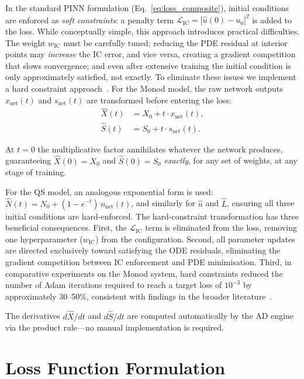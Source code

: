 \documentclass[14pt,a4paper,openany]{extbook}
\begin{document}
In the standard PINN formulation (Eq.~\ref{eq:loss_composite}), initial
conditions are enforced as \emph{soft constraints}: a penalty term
$\mathcal{L}_{\mathrm{IC}} = |\hat{u}(0) - u_0|^2$ is added to the loss.
While conceptually simple, this approach introduces practical difficulties.
The weight $w_{\mathrm{IC}}$ must be carefully tuned; reducing the PDE
residual at interior points may \emph{increase} the IC error, and vice
versa, creating a gradient competition that slows convergence; and even
after extensive training the initial condition is only approximately
satisfied, not exactly. To eliminate these issues we implement a hard constraint approach~\cite{lagaris1998artificial, sukumar2022exact}. For the Monod model, the raw network outputs $x_{\mathrm{net}}(t)$ and
$s_{\mathrm{net}}(t)$ are transformed before entering the loss:
%
\begin{align}
\label{eq:hard_X}
\hat{X}(t) &= X_0 + t \cdot x_{\mathrm{net}}(t), \\[4pt]
\label{eq:hard_S}
\hat{S}(t) &= S_0 + t \cdot s_{\mathrm{net}}(t).
\end{align}

At $t = 0$ the multiplicative factor annihilates whatever the network
produces, guaranteeing $\hat{X}(0) = X_0$ and $\hat{S}(0) = S_0$
\emph{exactly}, for any set of weights, at any stage of training.

For the QS model, an analogous exponential form is used:
$\hat{N}(t) = N_0 + (1 - e^{-t})\,n_{\mathrm{net}}(t)$, and similarly
for $\hat{u}$ and $\hat{L}$, ensuring all three initial conditions are
hard-enforced.
The hard-constraint transformation has three beneficial consequences.
First, the $\mathcal{L}_{\mathrm{IC}}$ term is eliminated from the loss,
removing one hyperparameter ($w_{\mathrm{IC}}$) from the configuration.
Second, all parameter updates are directed exclusively toward satisfying
the ODE residuals, eliminating the gradient competition between IC
enforcement and PDE minimisation.
Third, in comparative experiments on the Monod system, hard constraints
reduced the number of Adam iterations required to reach a target loss of
$10^{-3}$ by approximately 30--50\%, consistent with findings in the
broader literature~\cite{sukumar2022exact}.

The derivatives $d\hat{X}/dt$ and $d\hat{S}/dt$ are computed automatically
by the AD engine via the product rule---no manual implementation is required.

\section{Loss Function Formulation}
\label{sec:loss_formulation}
\end{document}
